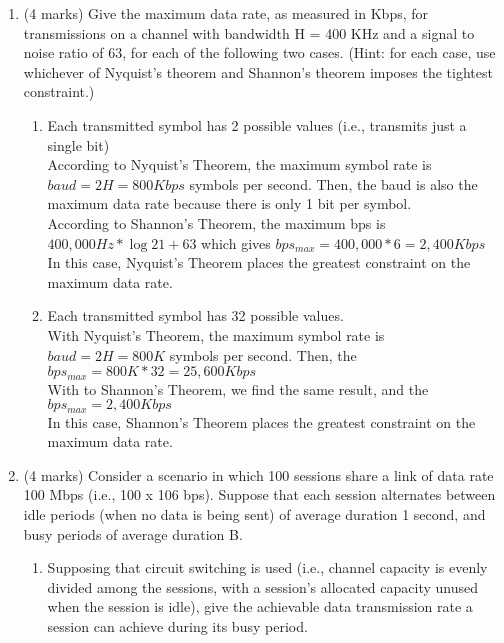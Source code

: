 \documentclass[10pt]{amsart}
\begin{document}
\begin{enumerate}
    \item (4 marks) Give the maximum data rate, as measured in Kbps, for transmissions on a channel with bandwidth H = 400 KHz and a signal to noise ratio of 63, for each of the following two cases. (Hint: for each case, use whichever of Nyquist’s theorem and Shannon’s theorem imposes the tightest constraint.)
    \begin{enumerate}
        \item Each transmitted symbol has 2 possible values (i.e., transmits just a single bit)\\
            According to Nyquist's Theorem, the maximum symbol rate is $baud =
            2H = 800Kbps$ symbols per second.  Then, the baud is also the
            maximum data rate because there is only 1 bit per symbol.\\
            According to Shannon's Theorem, the maximum bps is
            $400,000Hz*\log{2}{1 + 63}$ which gives $bps_{max} = 400,000*6 =
            2,400Kbps$\\ In this case, Nyquist's Theorem places the greatest
            constraint on the maximum data rate.\\
        \item Each transmitted symbol has 32 possible values.\\
            With Nyquist's Theorem, the maximum symbol rate is $baud = 2H =
            800K$ symbols per second.  Then, the $bps_{max} = 800K * 32 =
            25,600Kbps$\\
            With to Shannon's Theorem, we find the same result, and the
            $bps_{max} = 2,400Kbps$\\ In this case, Shannon's Theorem places the
            greatest constraint on the maximum data rate.\\
    \end{enumerate}
    \item (4 marks) Consider a scenario in which 100 sessions share a link of data
    rate 100 Mbps (i.e., 100 x 106 bps). Suppose that each session alternates
    between idle periods (when no data is being sent) of average duration 1
    second, and busy periods of average duration B.
    \begin{enumerate}
        \item Supposing that circuit switching is used (i.e., channel capacity
            is evenly divided among the sessions, with a session’s allocated
            capacity unused when the session is idle), give the achievable data
            transmission rate a session can achieve during its busy period.

\end{enumerate}
\end{enumerate}
\end{document}
